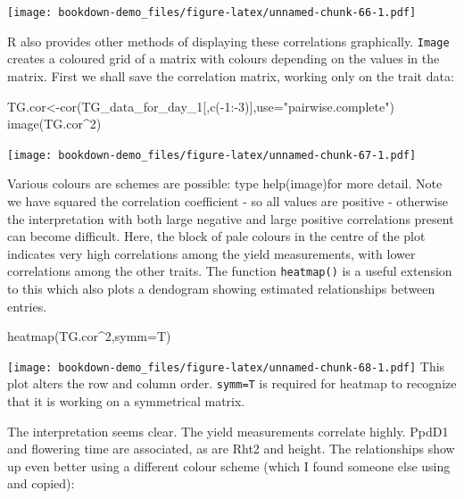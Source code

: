 \documentclass[
]{book}
\newenvironment{Shaded}{\begin{snugshade}}{\end{snugshade}}
\newcommand{\AttributeTok}[1]{\textcolor[rgb]{0.77,0.63,0.00}{#1}}
\newcommand{\DecValTok}[1]{\textcolor[rgb]{0.00,0.00,0.81}{#1}}
\newcommand{\FunctionTok}[1]{\textcolor[rgb]{0.00,0.00,0.00}{#1}}
\newcommand{\NormalTok}[1]{#1}
\newcommand{\OtherTok}[1]{\textcolor[rgb]{0.56,0.35,0.01}{#1}}
\newcommand{\SpecialCharTok}[1]{\textcolor[rgb]{0.00,0.00,0.00}{#1}}
\newcommand{\StringTok}[1]{\textcolor[rgb]{0.31,0.60,0.02}{#1}}
\begin{document}
\texttt{[image: bookdown-demo\_files/figure-latex/unnamed-chunk-66-1.pdf]}

R also provides other methods of displaying these correlations graphically. \texttt{Image} creates a coloured grid of a matrix with colours depending on the values in the matrix. First we shall save the correlation matrix, working only on the trait data:

\begin{Shaded}
\begin{Highlighting}[]
\NormalTok{TG.cor}\OtherTok{\textless{}{-}}\FunctionTok{cor}\NormalTok{(TG\_data\_for\_day\_1[,}\FunctionTok{c}\NormalTok{(}\SpecialCharTok{{-}}\DecValTok{1}\SpecialCharTok{:{-}}\DecValTok{3}\NormalTok{)],}\AttributeTok{use=}\StringTok{"pairwise.complete"}\NormalTok{)}
\FunctionTok{image}\NormalTok{(TG.cor}\SpecialCharTok{\^{}}\DecValTok{2}\NormalTok{)}
\end{Highlighting}
\end{Shaded}

\texttt{[image: bookdown-demo\_files/figure-latex/unnamed-chunk-67-1.pdf]}

Various colours are schemes are possible: type help(image)for more detail. Note we have squared the correlation coefficient - so all values are positive - otherwise the interpretation with both large negative and large positive correlations present can become difficult. Here, the block of pale colours in the centre of the plot indicates very high correlations among the yield measurements, with lower correlations among the other traits. The function \texttt{heatmap()} is a useful extension to this which also plots a dendogram showing estimated relationships between entries.

\begin{Shaded}
\begin{Highlighting}[]
\FunctionTok{heatmap}\NormalTok{(TG.cor}\SpecialCharTok{\^{}}\DecValTok{2}\NormalTok{,}\AttributeTok{symm=}\NormalTok{T)}
\end{Highlighting}
\end{Shaded}

\texttt{[image: bookdown-demo\_files/figure-latex/unnamed-chunk-68-1.pdf]}
This plot alters the row and column order. \texttt{symm=T} is required for heatmap to recognize that it is working on a symmetrical matrix.

The interpretation seems clear. The yield measurements correlate highly. PpdD1 and flowering time are associated, as are Rht2 and height. The relationships show up even better using a different colour scheme (which I found someone else using and copied):
\end{document}
